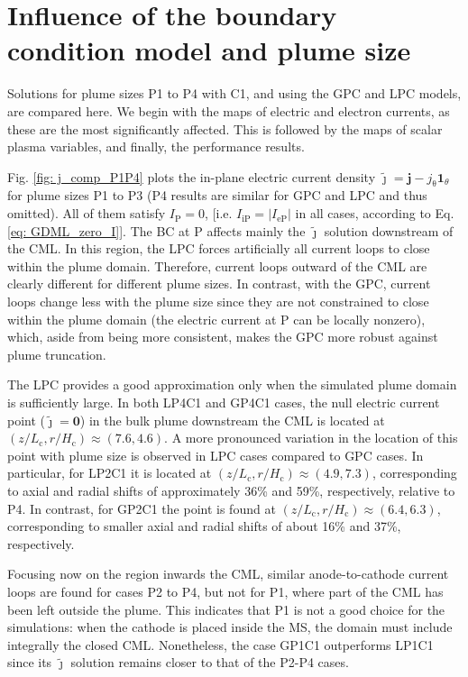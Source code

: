 \documentclass[%
 aip,
cha,
 amsmath,amssymb,
 reprint,%
]{revtex4-1}
\begin{document}
\section{Influence of the boundary condition model and plume size}\label{sec: comp_local_GDML}


Solutions for plume sizes P1 to P4 with C1, and using the GPC and LPC models, are compared here. We begin with the maps of electric and electron currents, as these are the most significantly affected. This is followed by the maps of scalar plasma variables, and finally, the performance results.



Fig. \ref{fig: j_comp_P1P4} plots the in-plane electric current density $\tilde{\bm\jmath}= \bm j - j_\mathrm{\theta}\bm 1_\theta$ for plume sizes P1 to P3 (P4 results are similar for GPC and LPC and thus omitted). All of them satisfy $I_\mathrm{P}=0$, [i.e. $I_\mathrm{iP} = |I_\mathrm{eP}|$ in all cases, according to Eq. \eqref{eq: GDML_zero_I}]. The BC at P affects mainly the $\bm{\tilde \jmath}$ solution downstream of the CML. In this region, the LPC forces artificially all current loops to close within the plume domain. Therefore, current loops outward of the CML are clearly different for different plume sizes. In contrast, with the GPC, current loops change less with the plume size since they are not constrained to close within the plume domain (the electric current at P can be locally nonzero), which, aside from being more consistent, makes the GPC more robust against plume truncation.
%

The LPC provides a good approximation only when the simulated plume domain is sufficiently large. In both LP4C1 and GP4C1 cases, the null electric current point ($\tilde{\bm \jmath} = \bm{0}$) in the bulk plume downstream the CML is located at $(z/L_\mathrm{c},r/H_\mathrm{c}) \approx (7.6,4.6)$.
%
A more pronounced variation in the location of this point with plume size is observed in LPC cases compared to GPC cases. In particular, for LP2C1 it is located at $(z/L_\mathrm{c},r/H_\mathrm{c}) \approx (4.9,7.3)$, corresponding to axial and radial shifts of approximately 36\% and 59\%, respectively, relative to P4. In contrast, for GP2C1 the point is found at $(z/L_\mathrm{c},r/H_\mathrm{c}) \approx (6.4,6.3)$, corresponding to smaller axial and radial shifts of about 16\% and 37\%, respectively.


Focusing now on the region inwards the CML, similar anode-to-cathode current loops are found for cases P2 to P4, but not for P1, where part of the CML has been left outside the plume. This indicates that P1 is not a good choice for the simulations: when the cathode is placed inside the MS, the domain must include integrally the closed CML. Nonetheless, the case GP1C1 outperforms LP1C1 since its $ \bm{\tilde \jmath}$ solution remains closer to that of the P2-P4 cases.
\end{document}
